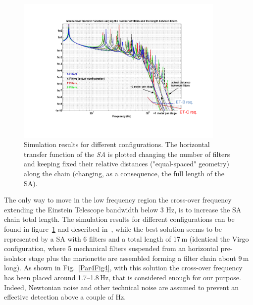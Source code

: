 \begin{figure}[t]
	\begin{center}
		\includegraphics[width=0.9\textwidth]{Detector/SASandSUS/SuspensionSystems/Suspension_Figures/Par4-Fig3.pdf}
			\caption{Simulation results for different configurations. The horizontal transfer function of the \emph{SA} is plotted changing the number of filters and keeping fixed their relative distances ("equal-spaced" geometry) along the chain (changing, as a consequence, the full length of the SA).}
\label{Par4Fig3}
	\end{center}
\end{figure}
%
The only way to move in the low frequency region the cross-over frequency extending the Einstein Telescope bandwidth below 3 Hz, is to increase the SA chain total length. The simulation results for different configurations can be found in figure~\ref{Par4Fig3} and described in~\cite{Braccini2010March1-3}, while the best solution seems to be represented by a SA with 6 filters and a total length of 17\,m (identical the Virgo configuration, where 5 mechanical filters suspended from an horizontal pre-isolator stage plus the marionette are assembled forming a filter chain about 9\,m long). As shown in Fig.~\ref{Par4Fig4}, with this solution the cross-over frequency has been placed around 1.7--1.8\,Hz, that is considered enough for our purpose. Indeed, Newtonian noise and other technical noise are assumed to prevent an effective detection above a couple of Hz.
%
